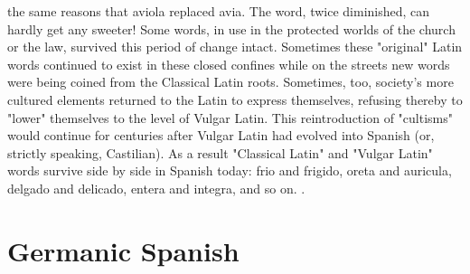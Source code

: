 the same reasons that aviola replaced avia. The word, twice diminished, can hardly get any sweeter!
Some words, in use in the protected worlds of the church or
the law, survived this period of change intact. Sometimes these "original" Latin words continued to exist in these closed confines while
on the streets new words were being coined from the Classical Latin
roots. Sometimes, too, society's more cultured elements returned to
the Latin to express themselves, refusing thereby to "lower" themselves to the level of Vulgar Latin. This reintroduction of "cultisms"
would continue for centuries after Vulgar Latin had evolved into Spanish (or, strictly speaking, Castilian). As a result "Classical Latin" and
"Vulgar Latin" words survive side by side in Spanish today: frio and
frigido, oreta and auricula, delgado and delicado, entera and integra,
and so on. .

\section{Germanic Spanish}

